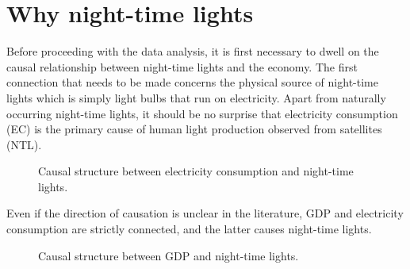 \chapter{Why night-time lights}\label{ch:whynighttimelights}
Before proceeding with the data analysis, it is first necessary to dwell on the causal relationship between night-time lights and the economy. 
The first connection that needs to be made concerns the physical source of night-time lights which is simply light bulbs that run on electricity. Apart from naturally occurring night-time lights, it should be no surprise that electricity consumption (EC) is the primary cause of human light production observed from satellites (NTL).
\begin{figure}[h!]
    \centering
    \label{fig:my_label}
    \caption{Causal structure between electricity consumption and night-time lights.}
\end{figure}


Even if the direction of causation is unclear in the literature, GDP and electricity consumption are strictly connected, and the latter causes night-time lights.
\begin{figure}[h!]
    \centering
    \label{fig:my_label}
    \caption{Causal structure between GDP and night-time lights.}
\end{figure}

